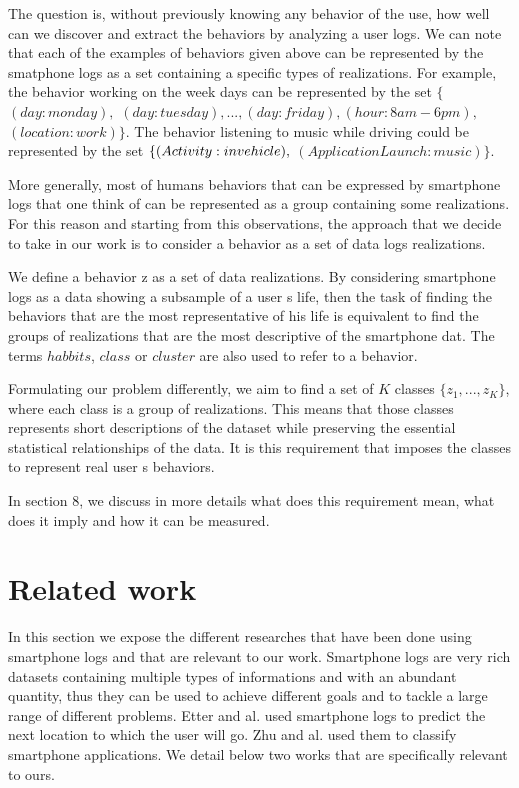 The question is, without previously knowing any behavior of the use, how well can we discover and extract the behaviors by analyzing a user logs.
We can note that each of the examples of behaviors given above can be represented by the smatphone logs as a set containing a specific types of realizations. For example, the behavior working on the week days can be represented by the set $\{$ $(day: monday),$ $(day: tuesday),$$...,$$(day: friday),$$(hour: 8am-6pm),$ $(location: work) \}$.  The behavior listening to music while driving could be represented by the set $\{ (Activity: in\- vehicle),$ $(Application Launch: music)\}$.

More generally, most of humans behaviors that can be expressed by smartphone logs that one think of can be represented as a group containing some realizations. For this reason and starting from this observations, the approach that we decide to take in our work is to consider a behavior as a set of data logs realizations.

We define a behavior z as a set of data realizations.  By considering smartphone logs as a data showing a subsample of a user s life, then the task of finding the behaviors that are the most representative of his life is equivalent to find the groups of realizations that are the most descriptive of the smartphone dat. The terms $habbits$, $class$ or $cluster$ are also used to refer to a behavior.

Formulating our problem differently, we aim to find a set of $K$ classes $\{ z_1,...,z_K \} $, where each class is a group of realizations. This means that those classes represents short descriptions of the dataset while preserving the essential statistical relationships of the data. It is this requirement that imposes the classes to represent real user s behaviors.

In section 8, we discuss in more details what does this requirement mean, what does it imply and how it can be measured.



\section{Related work}
In this section we expose the different researches that have been done using smartphone logs and that are relevant to our work. Smartphone logs are very rich datasets containing multiple types of informations and with an abundant quantity, thus they can be used to achieve different goals and to tackle a large range of different problems. Etter and al. \cite{wheretogo} used smartphone logs to predict the next location to which the user will go. Zhu and al. \cite{mobapp} used them to classify smartphone applications. We detail below two works that are specifically relevant to ours.

